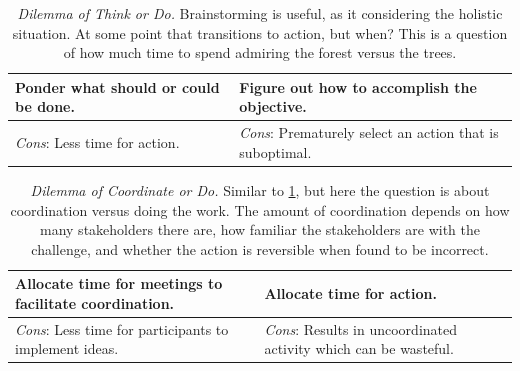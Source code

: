 \begin{center}
\begin{table}[H] %
\begin{tabular}{ | m{\dilemmatablewidth}| m{\dilemmatablewidth} | } 
  \hline
  \textbf{Ponder what should or could be done.} &
  \textbf{Figure out how to accomplish the objective.}\\
  \hline
  \textit{Cons}: Less time for action. & 
  \textit{Cons}: Prematurely select an action that is suboptimal. \\
  \hline
\end{tabular}
\caption{\textit{Dilemma of Think or Do.}
Brainstorming is useful, as it considering the holistic situation. At some point that transitions to action, but when? This is a question of how much time to spend admiring the forest versus the trees. 
}
\label{table:forest-vs-trees}
\end{table}
\end{center}




\begin{center}
\begin{table}[H] %
\begin{tabular}{ | m{\dilemmatablewidth}| m{\dilemmatablewidth} | } 
  \hline
  \textbf{Allocate time for meetings to facilitate coordination.} &
  \textbf{Allocate time for action.} \\
  \hline
  \textit{Cons}: Less time for participants to implement ideas. & 
  \textit{Cons}: Results in uncoordinated activity which can be wasteful. \\
  \hline
\end{tabular}
\caption{\textit{Dilemma of Coordinate or Do.}
Similar to \ref{table:forest-vs-trees}, but here the question is about coordination versus doing the work. The amount of coordination depends on how many stakeholders there are, how familiar the stakeholders are with the challenge, and whether the action is reversible when found to be incorrect.
}
\label{table:meetings-versus-work}
\end{table}
\end{center}


